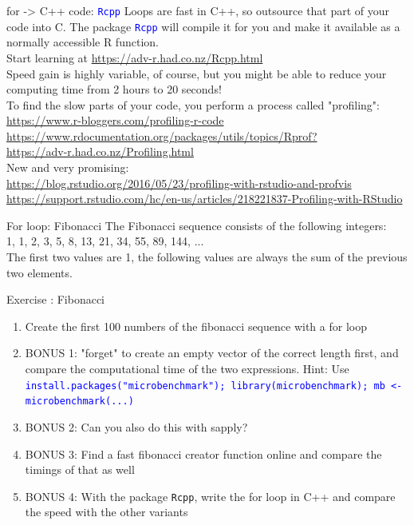 \documentclass[xcolor=table,       handout,    xcolor=dvipsnames]{beamer}\usepackage[]{graphicx}\usepackage[]{color}
\newcounter{exercisecount}
\newenvironment{exercise}[1]
{%
\stepcounter{exercisecount}
\begin{block}{Exercise \arabic{exercisecount}: #1}
}
{%
\end{block} }
\newcommand{\rcode}[1]{\texttt{\textcolor{Blue}{#1}}} %
\begin{document}

\begin{frame}[fragile]{for -> C++ code: \rcode{Rcpp}}
\small
Loops are fast in C++, so outsource that part of your code into C.
The package \rcode{Rcpp} will compile it for you and make it available as a normally accessible R function.\\
\pause
Start learning at 
\url{https://adv-r.had.co.nz/Rcpp.html}\\
\pause
Speed gain is highly variable, of course, but you might be able to reduce your computing time from 2 hours to 20 seconds!\\[1em]
\pause
To find the slow parts of your code, you perform a process called "profiling":\\
\url{https://www.r-bloggers.com/profiling-r-code}\\
\url{https://www.rdocumentation.org/packages/utils/topics/Rprof?}\\
\url{https://adv-r.had.co.nz/Profiling.html}\\
\pause
New and very promising:\\
\scriptsize
\url{https://blog.rstudio.org/2016/05/23/profiling-with-rstudio-and-profvis}\\
\url{https://support.rstudio.com/hc/en-us/articles/218221837-Profiling-with-RStudio}
\end{frame}


\begin{frame}[fragile]{For loop: Fibonacci}
The Fibonacci sequence consists of the following integers:\\
1, 1, 2, 3, 5, 8, 13, 21, 34, 55, 89, 144, ...\\
The first two values are 1, the following values are always the sum of the previous two elements.
\begin{exercise}{Fibonacci}
\begin{enumerate}
\item Create the first 100 numbers of the fibonacci sequence with a for loop
\item BONUS 1: "forget" to create an empty vector of the correct length first, and compare the computational time of the two expressions. Hint: Use \rcode{install.packages("microbenchmark"); library(microbenchmark); mb <- microbenchmark(...)}
\item BONUS 2: Can you also do this with sapply?
\item BONUS 3: Find a fast fibonacci creator function online and compare the timings of that as well
\item BONUS 4: With the package \texttt{Rcpp}, write the for loop in C++ and compare the speed with the other variants
\end{enumerate}
\end{exercise}
\end{frame}
\end{document}
